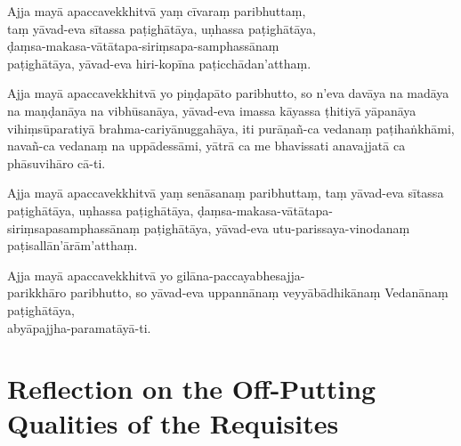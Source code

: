 
Ajja mayā apaccavekkhitvā yaṃ cīvaraṃ paribhuttaṃ,\\
taṃ yāvad-eva sītassa paṭighātāya, uṇhassa paṭighātāya,\\
ḍaṃsa-makasa-vātātapa-siriṃsapa-samphassānaṃ\\
paṭighātāya, yāvad-eva hiri-kopīna paṭicchādan'atthaṃ.

Ajja mayā apaccavekkhitvā yo piṇḍapāto paribhutto, so n'eva davāya na madāya na
maṇḍanāya na vibhūsanāya, yāvad-eva imassa kāyassa ṭhitiyā yāpanāya
vihiṃsūparatiyā brahma-cariyānuggahāya, iti purāṇañ-ca vedanaṃ paṭihaṅkhāmi,
navañ-ca vedanaṃ na uppādessāmi, yātrā ca me bhavissati anavajjatā ca
phāsuvihāro cā-ti.

Ajja mayā apaccavekkhitvā yaṃ senāsanaṃ paribhuttaṃ, taṃ yāvad-eva sītassa
paṭighātāya, uṇhassa paṭighātāya, ḍaṃsa-makasa-vātātapa-siriṃsapasamphassānaṃ
paṭighātāya, yāvad-eva utu-parissaya-vinodanaṃ paṭisallān'ārām'atthaṃ.

Ajja mayā apaccavekkhitvā yo gilāna-paccayabhesajja-\\ parikkhāro paribhutto, so
yāvad-eva uppannānaṃ veyyābādhikānaṃ Vedanānaṃ paṭighātāya,\\
abyāpajjha-paramatāyā-ti. 

\section[Reflection on the Off-Putting Qualities]{Reflection on the Off-Putting Qualities of the Requisites}

\begin{leader}
\end{leader}


